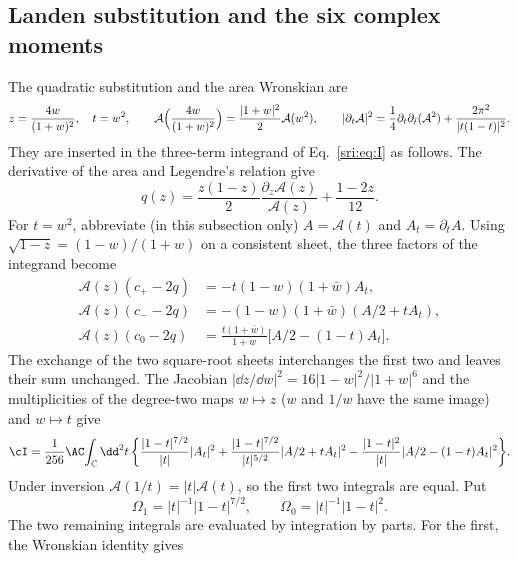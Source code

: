 \subsection{Landen substitution and the six complex moments}\label{sri:app:cform:landen}
The quadratic substitution and the area Wronskian are
\begin{equation}
 z=\frac{4w}{(1+w)^2},\quad t=w^2,\qquad
 \mathcal A\Bigl(\frac{4w}{(1+w)^2}\Bigr)=\frac{|1+w|^2}{2}\mathcal A(w^2),\qquad
 |\partial_t\mathcal A|^2=\frac14\partial_t\partial_{\bar t}(\mathcal A^2)+\frac{2\pi^2}{|t(1-t)|^2}.
 \label{sri:eq:cform:landen}
\end{equation}
They are inserted in the three-term integrand of Eq.~\eqref{sri:eq:I} as follows. The derivative of the area and
Legendre's relation give
\begin{equation}
 q(z)=\frac{z(1-z)}{2}\frac{\partial_z\mathcal A(z)}{\mathcal A(z)}+\frac{1-2z}{12}.
\end{equation}
For $t=w^2$, abbreviate (in this subsection only) $A=\mathcal A(t)$ and $A_t=\partial_tA$. Using
$\sqrt{1-z}=(1-w)/(1+w)$ on a consistent sheet, the three factors of the integrand become
\begin{equation}
\begin{aligned}
 \mathcal A(z)(c_+-2q)&=-t(1-w)(1+\bar w)A_t,\\
 \mathcal A(z)(c_--2q)&=-(1-w)(1+\bar w)(A/2+tA_t),\\
 \mathcal A(z)(c_0-2q)&=\frac{t(1+\bar w)}{1+w}\bigl[A/2-(1-t)A_t\bigr].
\end{aligned}
\end{equation}
The exchange of the two square-root sheets interchanges the first two and leaves their sum unchanged. The Jacobian
$|\dd z/\dd w|^2=16|1-w|^2/|1+w|^6$ and the multiplicities of the degree-two maps $w\mapsto z$ ($w$ and $1/w$ have the
same image) and $w\mapsto t$ give
\begin{equation}
 \cI=\frac1{256}\AC\!\int_{\mathbb C}\dd^2t\,\biggl\{\frac{|1-t|^{7/2}}{|t|}|A_t|^2
 +\frac{|1-t|^{7/2}}{|t|^{5/2}}|A/2+tA_t|^2-\frac{|1-t|^2}{|t|}|A/2-(1-t)A_t|^2\biggr\}.
 \label{sri:eq:cform:landenI}
\end{equation}
Under inversion $\mathcal A(1/t)=|t|\mathcal A(t)$, so the first two integrals are equal. Put
\begin{equation}
 \Omega_1=|t|^{-1}|1-t|^{7/2},\qquad\Omega_0=|t|^{-1}|1-t|^2.
\end{equation}
The two remaining integrals are evaluated by integration by parts. For the first, the Wronskian identity gives
